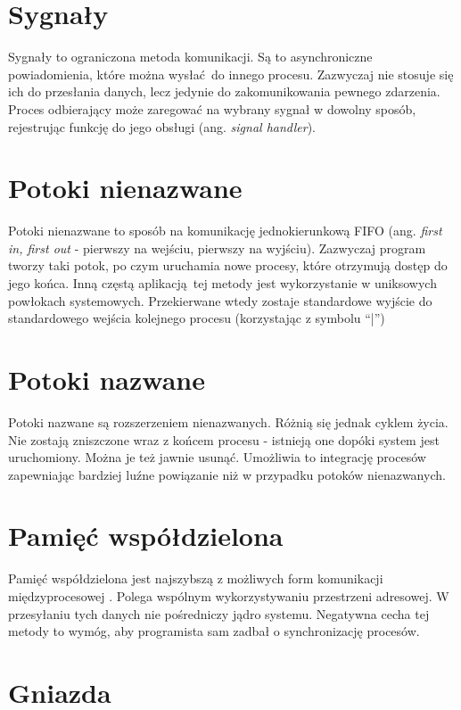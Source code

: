 \section{Sygnały}

Sygnały to ograniczona metoda komunikacji. Są to asynchroniczne powiadomienia, które można wysłać do innego procesu. Zazwyczaj nie stosuje się ich do przesłania danych, lecz jedynie do zakomunikowania pewnego zdarzenia. Proces odbierający może zaregować na wybrany sygnał w dowolny sposób, rejestrując funkcję do jego obsługi (ang. \textit{signal handler}).


\section{Potoki nienazwane}

Potoki nienazwane to sposób na komunikację jednokierunkową FIFO (ang. \textit{first in, first out} - pierwszy na wejściu, pierwszy na wyjściu). Zazwyczaj program tworzy taki potok, po czym uruchamia nowe procesy, które otrzymują dostęp do jego końca. Inną częstą aplikacją tej metody jest wykorzystanie w uniksowych powłokach systemowych. Przekierwane wtedy zostaje standardowe wyjście do standardowego wejścia kolejnego procesu (korzystając z symbolu \enquote{|})


\section{Potoki nazwane}

Potoki nazwane są rozszerzeniem nienazwanych. Różnią się jednak cyklem życia. Nie zostają zniszczone wraz z końcem procesu - istnieją one dopóki system jest uruchomiony. Można je też jawnie usunąć. Umożliwia to integrację procesów zapewniając bardziej luźne powiązanie niż w przypadku potoków nienazwanych.


\section{Pamięć współdzielona}

Pamięć współdzielona jest najszybszą z możliwych form komunikacji międzyprocesowej \cite{Ste92}. Polega wspólnym wykorzystywaniu przestrzeni adresowej. W przesyłaniu tych danych nie pośredniczy jądro systemu. Negatywna cecha tej metody to wymóg, aby programista sam zadbał o synchronizację procesów.


\section{Gniazda}

